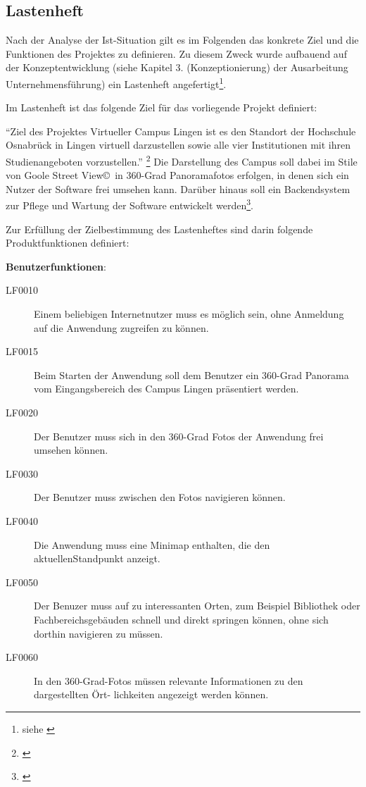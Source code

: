 \subsection{Lastenheft}
\label{sec:Lastenheft}

Nach der Analyse der Ist-Situation gilt es im Folgenden das konkrete Ziel und die Funktionen des Projektes zu definieren. 
Zu diesem Zweck wurde aufbauend auf der Konzeptentwicklung (siehe Kapitel 3. (Konzeptionierung) der Ausarbeitung Unternehmensführung) ein
Lastenheft angefertigt\footnote{siehe \citet{lastenheft2013}}.

Im Lastenheft ist das folgende Ziel für das vorliegende Projekt definiert:

"`Ziel des Projektes Virtueller Campus Lingen ist es den Standort der Hochschule Osnabrück
in Lingen virtuell darzustellen sowie alle vier Institutionen mit ihren Studienangeboten
vorzustellen."' \footnote{\citet{lastenheft2013}}
Die Darstellung des Campus soll dabei im Stile von Goole Street View\copyright\ in 360-Grad Panoramafotos erfolgen, in 
denen sich ein Nutzer der Software frei umsehen kann. Darüber hinaus soll ein Backendsystem zur Pflege und Wartung der 
Software entwickelt werden\footnote{\citet{lastenheft2013}}.

Zur Erfüllung der Zielbestimmung des Lastenheftes sind darin folgende Produktfunktionen definiert:

\textbf{Benutzerfunktionen}:

\begin{description}
  \item[LF0010] Einem beliebigen Internetnutzer muss es möglich sein, ohne Anmeldung auf die
  Anwendung zugreifen zu können.
  \item[LF0015] Beim Starten der Anwendung soll dem Benutzer ein 360-Grad Panorama vom
  Eingangsbereich des Campus Lingen präsentiert werden.
  \item[LF0020] Der Benutzer muss sich in den 360-Grad Fotos der Anwendung frei umsehen
  können.
  \item[LF0030] Der Benutzer muss zwischen den Fotos navigieren können.
  \item[LF0040] Die Anwendung muss eine Minimap enthalten, die den aktuellenStandpunkt anzeigt.
  \item[LF0050] Der Benuzer muss auf zu interessanten Orten, zum Beispiel Bibliothek oder Fachbereichsgebäuden schnell und direkt springen können, ohne sich dorthin navigieren zu müssen.
  \item[LF0060] In den 360-Grad-Fotos müssen relevante Informationen zu den dargestellten Ört-
  lichkeiten angezeigt werden können.
\end{description}

